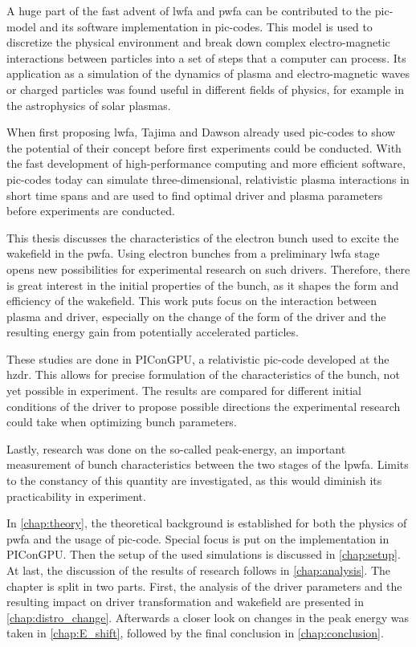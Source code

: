 \documentclass[bachelor_thesis]{subfiles}
\begin{document}
A huge part of the fast advent of \gls{lwfa} and \gls{pwfa} can be contributed to the \gls{pic}-model and its software implementation in \gls{pic}-codes.
This model is used to discretize the physical environment and break down complex electro-magnetic interactions between particles into a set of steps that a computer can process.
Its application as a simulation of the dynamics of plasma and electro-magnetic waves or charged particles was found useful in different fields of physics, for example in the astrophysics of solar plasmas.

When first proposing \gls{lwfa}, Tajima and Dawson already used \gls{pic}-codes to show the potential of their concept before first experiments could be conducted. 
With the fast development of high-performance computing and more efficient software, \gls{pic}-codes today can simulate three-dimensional, relativistic plasma interactions in short time spans
and are used to find optimal driver and plasma parameters before experiments are conducted.

This thesis discusses the characteristics of the electron bunch used to excite the wakefield in the \gls{pwfa}.
Using electron bunches from a preliminary \gls{lwfa} stage opens new possibilities for experimental research on such drivers.
Therefore, there is great interest in the initial properties of the bunch, as it shapes the form and efficiency of the wakefield.
This work puts focus on the interaction between plasma and driver, especially on the change of the form of the driver and the resulting energy gain from potentially accelerated particles.

These studies are done in PIConGPU, a relativistic \gls{pic}-code developed at the \gls{hzdr}. This allows for precise formulation of the characteristics of the bunch, not yet possible in experiment.
The results are compared for different initial conditions of the driver to propose possible directions the experimental research could take when optimizing bunch parameters.

Lastly, research was done on the so-called peak-energy, an important measurement of bunch characteristics between the two stages of the \gls{lpwfa}.
Limits to the constancy of this quantity are investigated, as this would diminish its practicability in experiment.

In \autoref{chap:theory}, the theoretical background is established for both the physics of \gls{pwfa} and the usage of \gls{pic}-code. Special focus is put on the implementation in PIConGPU.
Then the setup of the used simulations is discussed in \autoref{chap:setup}.
At last, the discussion of the results of research follows in \autoref{chap:analysis}. The chapter is split in two parts. First, the analysis of the driver parameters and the resulting impact on driver transformation and wakefield are presented in \autoref{chap:distro_change}.
Afterwards a closer look on changes in the peak energy was taken in \autoref{chap:E_shift}, followed by the final conclusion in \autoref{chap:conclusion}.
\end{document}
